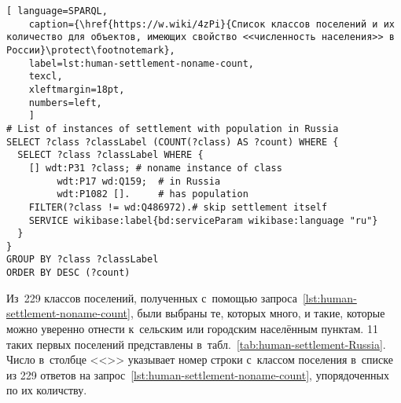 \begin{lstlisting}[ language=SPARQL, 
    caption={\href{https://w.wiki/4zPi}{Список классов поселений и их количество для объектов, имеющих свойство <<численность населения>> в России}\protect\footnotemark},
    label=lst:human-settlement-noname-count,
    texcl,
    xleftmargin=18pt, 
    numbers=left,
    ]
# List of instances of settlement with population in Russia
SELECT ?class ?classLabel (COUNT(?class) AS ?count) WHERE {
  SELECT ?class ?classLabel WHERE {
    [] wdt:P31 ?class; # noname instance of class
         wdt:P17 wd:Q159;  # in Russia
         wdt:P1082 [].     # has population
    FILTER(?class != wd:Q486972).# skip settlement itself
    SERVICE wikibase:label{bd:serviceParam wikibase:language "ru"}
  }
}
GROUP BY ?class ?classLabel
ORDER BY DESC (?count)
\end{lstlisting}%

Из~229 классов поселений, полученных с~помощью запроса~\ref{lst:human-settlement-noname-count}, 
были выбраны те, которых много, 
и такие, которые можно уверенно отнести к~сельским или городским населённым пунктам. 
11 таких первых поселений 
представлены в~табл.~\ref{tab:human-settlement-Russia}. 
    Число в~столбце <<\textnumero>> указывает номер строки с~классом поселения 
    в~списке из 229 ответов на запрос~\ref{lst:human-settlement-noname-count}, 
    упорядоченных по их количству.



